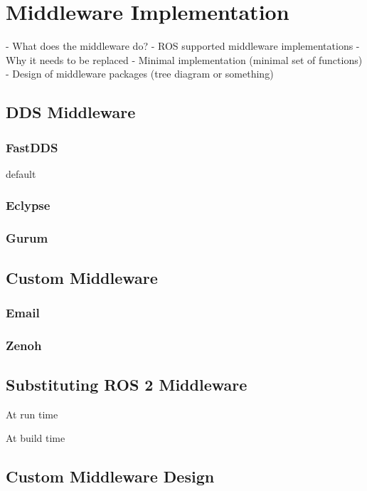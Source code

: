 \chapter{Middleware Implementation}\label{cha:middleware}


- What does the middleware do?
- ROS supported middleware implementations
- Why it needs to be replaced
- Minimal implementation (minimal set of functions)
- Design of middleware packages (tree diagram or something)


\section{DDS Middleware}\label{sec:middleware_dds}

    \subsection{FastDDS}

    default

    \subsection{Eclypse}

    \subsection{Gurum}


\section{Custom Middleware}\label{sec:middleware_custom}

    \subsection{Email}

    \subsection{Zenoh}

\section{Substituting ROS 2 Middleware}\label{sec:middleware_substitute}

    At run time

    At build time

\section{Custom Middleware Design}\label{sec:middleware_design}


